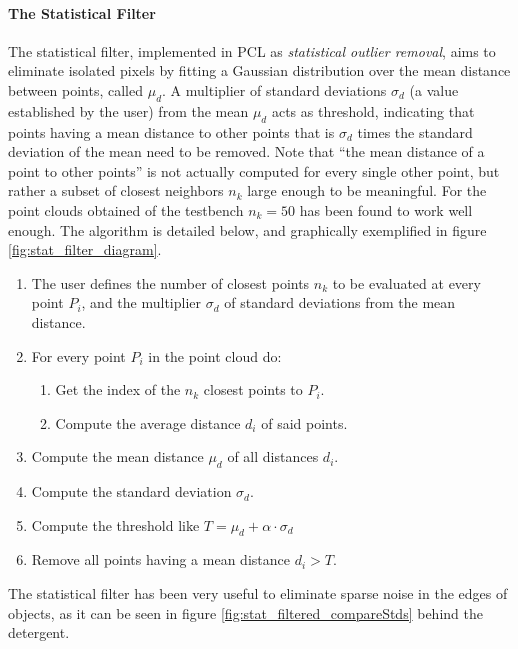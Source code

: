 \documentclass[../main.tex]{subfiles}
\begin{document}
\paragraph{The Statistical Filter}
The statistical filter, implemented in PCL as \emph{statistical outlier removal}, aims to eliminate isolated pixels by fitting a Gaussian distribution over the mean distance between points, called $\mu_{d}$. A multiplier of standard deviations $\sigma_{d}$ (a value established by the user) from the mean $\mu_{d}$ acts as threshold, indicating that points having a mean distance to other points that is $\sigma_{d}$ times the standard deviation of the mean need to be removed. Note that ``the mean distance of a point to other points'' is not actually computed for every single other point, but rather a subset of closest neighbors $n_{k}$ large enough to be meaningful. For the point clouds obtained of the testbench $n_{k}=50$ has been found to work well enough. The algorithm is detailed below, and graphically exemplified in figure \ref{fig:stat_filter_diagram}.

\begin{enumerate}
    \item The user defines the number of closest points $n_{k}$ to be evaluated at every point $P_{i}$, and the multiplier $\sigma_{d}$ of standard deviations from the mean distance.
    \item For every point $P_{i}$ in the point cloud do:
    \begin{enumerate}
        \item Get the index of the $n_{k}$ closest points to $P_{i}$.
        \item Compute the average distance $d_{i}$ of said points.
    \end{enumerate}
    \item Compute the mean distance $\mu_{d}$ of all distances $d_{i}$.
    \item Compute the standard deviation $\sigma_{d}$.
    \item Compute the threshold like $T=\mu_{d} + \alpha \cdot \sigma_{d}$
    \item Remove all points having a mean distance $d_{i} > T$.
\end{enumerate}

The statistical filter has been very useful to eliminate sparse noise in the edges of objects, as it can be seen in figure \ref{fig:stat_filtered_compareStds} behind the detergent.
\end{document}
